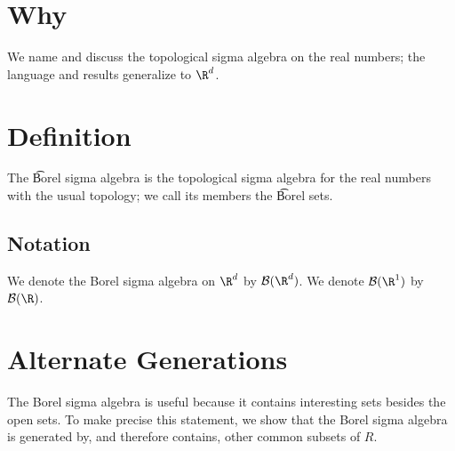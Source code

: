 

\section*{Why}

We name and discuss the topological sigma algebra on the real numbers; the language and results generalize to $\R ^d$.

\section*{Definition}

The \t{Borel sigma algebra} is the topological sigma algebra for the real numbers with the usual topology; we call its members the \t{Borel sets}.

\subsection*{Notation}

We denote the Borel sigma algebra on $\R ^d$ by $\mathcal{B} (\R ^d)$.
We denote $\mathcal{B} (\R ^1)$ by $\mathcal{B} (\R )$.

\section*{Alternate Generations}

The Borel sigma algebra is useful because it contains interesting sets besides the open sets.
To make precise this statement, we show that the Borel sigma algebra is generated by, and therefore contains, other common subsets of $R$.

